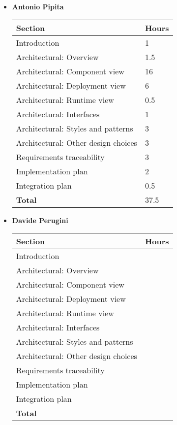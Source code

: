 \begin{itemize}
\item \textbf{Antonio Pipita}

\begin{table}[!h]
\centering
\begin{tabular}{|l|l|}
\hline
\textbf{Section}														&		\textbf{Hours}  \\ \hline
Introduction														&  	1	\\ \hline
Architectural: Overview						& 		1.5 	\\ \hline
Architectural: Component view						& 		16 	\\ \hline
Architectural: Deployment view						& 		6 	\\ \hline
Architectural: Runtime view						& 	0.5	 	\\ \hline
Architectural: Interfaces						& 	1	 	\\ \hline
Architectural: Styles and patterns					& 	3	 	\\ \hline
Architectural: Other design choices					& 	3	 	\\ \hline
Requirements traceability					& 	3	 	\\ \hline
Implementation plan					& 		2 	\\ \hline
Integration plan					& 		0.5 	\\ \hline
\textbf{Total}															& 37.5 	\\ \hline
\end{tabular}
\end{table}

\item \textbf{Davide Perugini}

\begin{table}[!h]
	\centering
	\begin{tabular}{|l|l|}
		\hline
		\textbf{Section}														&		\textbf{Hours}  \\ \hline
		Introduction														&  		\\ \hline
		Architectural: Overview						& 		 	\\ \hline
		Architectural: Component view						& 		 	\\ \hline
		Architectural: Deployment view						& 		 	\\ \hline
		Architectural: Runtime view						& 		 	\\ \hline
		Architectural: Interfaces						& 		 	\\ \hline
		Architectural: Styles and patterns					& 		 	\\ \hline
		Architectural: Other design choices					& 		 	\\ \hline
		Requirements traceability					& 		 	\\ \hline
		Implementation plan					& 		 	\\ \hline
		Integration plan					& 		 	\\ \hline
		\textbf{Total}															&  	\\ \hline
	\end{tabular}
\end{table}


\end{itemize}
